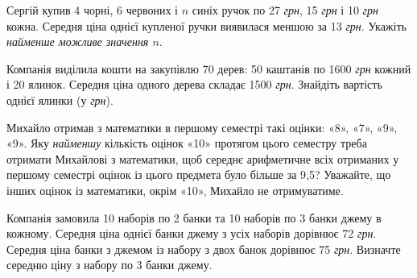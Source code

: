 \documentclass[12pt]{article}
\begin{document}
\begin{samepage}
\noindent\zadnum Сергій купив 4 чорні, 6 червоних і $n$ синіх ручок по 27 \textit{грн}, 15 \textit{грн} і 10 \textit{грн} кожна. Середня ціна однієї купленої ручки виявилася меншою за 13 \textit{грн}. Укажіть \textit{найменше можливе значення $n$}. 

\nmtnobreak
\nopagebreak\nbvspace{0.5cm}
\nmtAnswerBox
\par{}
\end{samepage}

\begin{samepage}
\noindent\zadnum Компанія виділила кошти на закупівлю 70 дерев: 50 каштанів по 1600 \textit{грн} кожний і 20 ялинок. Середня ціна одного дерева складає 1500 \textit{грн}. Знайдіть вартість однієї ялинки (у \textit{грн}). 

\nmtnobreak
\nopagebreak\nbvspace{0.5cm}
\nmtAnswerBox
\par{}
\end{samepage}

\begin{samepage}
\noindent\zadnum Михайло отримав з математики в першому семестрі такі оцінки: «8», «7», «9», «9». Яку \textit{найменшу} кількість оцінок «10» протягом цього семестру треба отримати Михайлові з математики, щоб середнє арифметичне всіх отриманих у першому семестрі оцінок із цього предмета було більше за 9{,}5? Уважайте, що інших оцінок із математики, окрім «10», Михайло не отримуватиме. 

\nmtnobreak
\nopagebreak\nbvspace{0.5cm}
\nmtAnswerBox
\par{}
\end{samepage}

\begin{samepage}
\noindent\zadnum Компанія замовила 10 наборів по 2 банки та 10 наборів по 3 банки джему в кожному. Середня ціна однієї банки джему з усіх наборів дорівнює 72 \textit{грн}. Середня ціна банки з джемом із набору з двох банок дорівнює 75 \textit{грн}. Визначте середню ціну з набору по 3 банки джему. 

\nmtnobreak
\nopagebreak\nbvspace{0.5cm}
\nmtAnswerBox
\par{}
\end{samepage}
\end{document}
